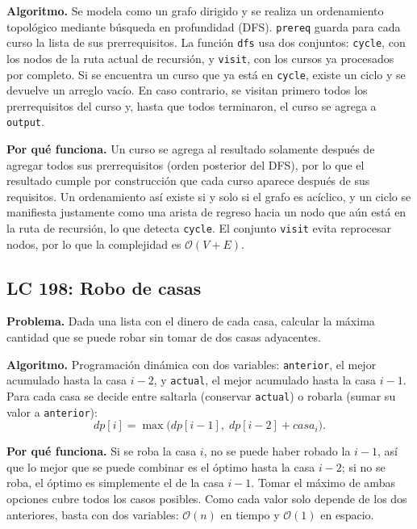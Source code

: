 \documentclass[11pt,letterpaper]{article}
\newcommand{\bigO}[1]{\ensuremath{\mathcal{O}(#1)}}
\begin{document}
\textbf{Algoritmo.} Se modela como un grafo dirigido y se realiza un ordenamiento topológico mediante búsqueda en profundidad (DFS). \texttt{prereq} guarda para cada curso la lista de sus prerrequisitos. La función \texttt{dfs} usa dos conjuntos: \texttt{cycle}, con los nodos de la ruta actual de recursión, y \texttt{visit}, con los cursos ya procesados por completo. Si se encuentra un curso que ya está en \texttt{cycle}, existe un ciclo y se devuelve un arreglo vacío. En caso contrario, se visitan primero todos los prerrequisitos del curso y, hasta que todos terminaron, el curso se agrega a \texttt{output}.

\textbf{Por qué funciona.} Un curso se agrega al resultado solamente después de agregar todos sus prerrequisitos (orden posterior del DFS), por lo que el resultado cumple por construcción que cada curso aparece después de sus requisitos. Un ordenamiento así existe si y solo si el grafo es acíclico, y un ciclo se manifiesta justamente como una arista de regreso hacia un nodo que aún está en la ruta de recursión, lo que detecta \texttt{cycle}. El conjunto \texttt{visit} evita reprocesar nodos, por lo que la complejidad es \bigO{V + E}.

\subsection{LC 198: Robo de casas}

\textbf{Problema.} Dada una lista con el dinero de cada casa, calcular la máxima cantidad que se puede robar sin tomar de dos casas adyacentes.

\textbf{Algoritmo.} Programación dinámica con dos variables: \texttt{anterior}, el mejor acumulado hasta la casa $i-2$, y \texttt{actual}, el mejor acumulado hasta la casa $i-1$. Para cada casa se decide entre saltarla (conservar \texttt{actual}) o robarla (sumar su valor a \texttt{anterior}):
\[
dp[i] = \max\bigl(dp[i-1],\; dp[i-2] + casa_i\bigr).
\]

\textbf{Por qué funciona.} Si se roba la casa $i$, no se puede haber robado la $i-1$, así que lo mejor que se puede combinar es el óptimo hasta la casa $i-2$; si no se roba, el óptimo es simplemente el de la casa $i-1$. Tomar el máximo de ambas opciones cubre todos los casos posibles. Como cada valor solo depende de los dos anteriores, basta con dos variables: \bigO{n} en tiempo y \bigO{1} en espacio.

\end{document}
